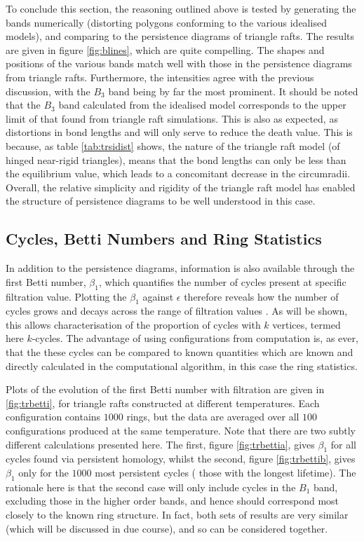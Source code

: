 To conclude this section, the reasoning outlined above is tested by generating the bands numerically (distorting polygons conforming to the various idealised models), and comparing to the persistence diagrams of triangle rafts. 
The results are given in figure \ref{fig:blines}, which are quite compelling.
The shapes and positions of the various bands match well with those in the persistence diagrams from triangle rafts.
Furthermore, the intensities agree with the previous discussion, with the $B_3$ band being by far the most prominent.
It should be noted that the $B_3$ band calculated from the idealised model corresponds to the upper limit of that found from triangle raft simulations.
This is also as expected, as distortions in bond lengths and will only serve to reduce the death value. 
This is because, as table \ref{tab:trsidist} shows, the nature of the triangle raft model (of hinged near\--rigid triangles), means that the bond lengths can only be less than the equilibrium value, which leads to a concomitant decrease in the circumradii.
Overall, the relative simplicity and rigidity of the triangle raft model has enabled the structure of persistence diagrams to be well understood in this \td{} case.

\subsection{Cycles, Betti Numbers and Ring Statistics}

In addition to the persistence diagrams, information is also available through the first Betti number, $\beta_1$, which quantifies the number of cycles present at specific filtration value.
Plotting the $\beta_1$ against $\epsilon$ therefore reveals how the number of cycles grows and decays across the range of filtration values \cite{Nakamura2015}.
As will be shown, this allows characterisation of the proportion of cycles with $k$ vertices, termed here $k$\--cycles.
The advantage of using configurations from computation is, as ever, that the these cycles can be compared to known quantities which are known and directly calculated in the computational algorithm, in this case the ring statistics.

Plots of the evolution of the first Betti number with filtration are given in  \ref{fig:trbetti}, for triangle rafts constructed at different temperatures.
Each configuration contains $1000$ rings, but the data are averaged over all $100$ configurations produced at the same temperature.
Note that there are two subtly different calculations presented here.
The first, figure \ref{fig:trbettia}, gives $\beta_1$ for all cycles found via persistent homology, whilst the second, figure \ref{fig:trbettib}, gives $\beta_1$ only for the $1000$ most persistent cycles (\ie{} those with the longest lifetime).
The rationale here is that the second case will only include cycles in the $B_1$ band, excluding those in the higher order bands, and hence should correspond most closely to the known ring structure.
In fact, both sets of results are very similar (which will be discussed in due course), and so can be considered together.

